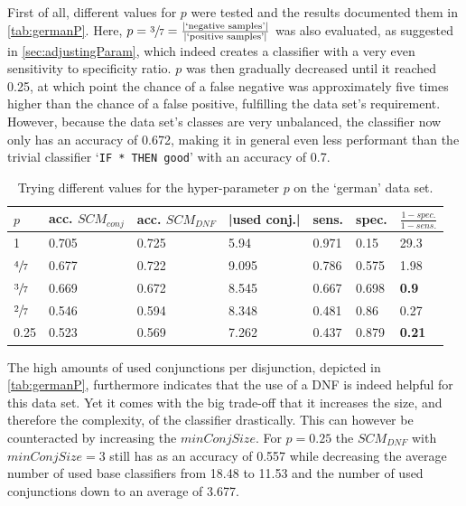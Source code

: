 
First of all, different values for \(p\) were tested and the results documented them in \autoref{tab:germanP}.
Here, \(p = \sfrac{3}{7} = \frac{|\text{`negative samples'}|}{|\text{`positive samples'}|}\) was also evaluated, as suggested in \autoref{sec:adjustingParam},
which indeed creates a classifier with a very even sensitivity to specificity ratio.
\(p\) was then gradually decreased until it reached 0.25, at which point the chance of a false negative was
approximately five times higher than the chance of a false positive, fulfilling the data set's requirement.
However, because the data set's classes are very unbalanced, the classifier now only has an accuracy of 0.672,
making it in general even less performant than the trivial classifier `\texttt{IF * THEN good}' with an accuracy of 0.7.

\begin{table}[ht]
    \centering
    \caption{Trying different values for the hyper-parameter \(p\) on the `german' data set.}\label{tab:germanP}
    \begin{tabular}{lllllll}
        \toprule
        \(p\) & acc. \(SCM_{conj}\) & acc. \(SCM_{DNF}\) & |used conj.| & sens. & spec. & \(\frac{1-spec.}{1-sens.}\) \\
        \midrule
        1 & 0.705 & 0.725 & 5.94 & 0.971 & 0.15 & 29.3 \\
        \(\sfrac{4}{7}\) & 0.677 & 0.722 & 9.095 & 0.786 & 0.575 & 1.98 \\
        \(\sfrac{3}{7}\) & 0.669 & 0.672 & 8.545 & 0.667 & 0.698 & \textbf{0.9} \\
        \(\sfrac{2}{7}\) & 0.546 & 0.594 & 8.348 & 0.481 & 0.86 & 0.27 \\
        0.25 & 0.523 & 0.569 & 7.262 & 0.437 & 0.879 & \textbf{0.21} \\
        \bottomrule
    \end{tabular}
\end{table}

The high amounts of used conjunctions per disjunction, depicted in \autoref{tab:germanP},
furthermore indicates that the use of a DNF is indeed helpful for this data set.
Yet it comes with the big trade-off that it increases the size, and therefore the complexity, of the classifier drastically.
This can however be counteracted by increasing the \(minConjSize\).
For \(p=0.25\) the \(SCM_{DNF}\) with \(minConjSize=3\) still has as an accuracy of 0.557
while decreasing the average number of used base classifiers from 18.48 to 11.53 and the number of used conjunctions down to an average of 3.677.


